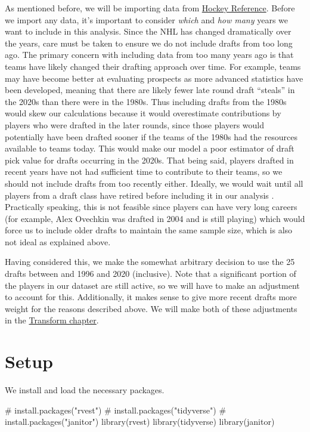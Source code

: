 \documentclass[
  letterpaper,
  DIV=11,
  numbers=noendperiod]{scrreprt}
\newenvironment{Shaded}{\begin{snugshade}}{\end{snugshade}}
\newcommand{\CommentTok}[1]{\textcolor[rgb]{0.37,0.37,0.37}{#1}}
\newcommand{\FunctionTok}[1]{\textcolor[rgb]{0.28,0.35,0.67}{#1}}
\newcommand{\NormalTok}[1]{\textcolor[rgb]{0.00,0.23,0.31}{#1}}
\begin{document}
As mentioned before, we will be importing data from
\href{https://www.hockey-reference.com/draft}{Hockey Reference}. Before
we import any data, it's important to consider \emph{which} and
\emph{how many} years we want to include in this analysis. Since the NHL
has changed dramatically over the years, care must be taken to ensure we
do not include drafts from too long ago. The primary concern with
including data from too many years ago is that teams have likely changed
their drafting approach over time. For example, teams may have become
better at evaluating prospects as more advanced statistics have been
developed, meaning that there are likely fewer late round draft
``steals'' in the 2020s than there were in the 1980s. Thus including
drafts from the 1980s would skew our calculations because it would
overestimate contributions by players who were drafted in the later
rounds, since those players would potentially have been drafted sooner
if the teams of the 1980s had the resources available to teams today.
This would make our model a poor estimator of draft pick value for
drafts occurring in the 2020s. That being said, players drafted in
recent years have not had sufficient time to contribute to their teams,
so we should not include drafts from too recently either. Ideally, we
would wait until all players from a draft class have retired before
including it in our analysis . Practically speaking, this is not
feasible since players can have very long careers (for example, Alex
Ovechkin was drafted in 2004 and is still playing) which would force us
to include older drafts to maintain the same sample size, which is also
not ideal as explained above.

Having considered this, we make the somewhat arbitrary decision to use
the 25 drafts between and 1996 and 2020 (inclusive). Note that a
significant portion of the players in our dataset are still active, so
we will have to make an adjustment to account for this. Additionally, it
makes sense to give more recent drafts more weight for the reasons
described above. We will make both of these adjustments in the
\href{https://trevsteu.github.io/Stat468_Final/transform.html}{Transform
chapter}.

\section{Setup}\label{setup}

We install and load the necessary packages.

\begin{Shaded}
\begin{Highlighting}[]
\CommentTok{\# install.packages("rvest")}
\CommentTok{\# install.packages("tidyverse")}
\CommentTok{\# install.packages("janitor")}
\FunctionTok{library}\NormalTok{(rvest)}
\FunctionTok{library}\NormalTok{(tidyverse)}
\FunctionTok{library}\NormalTok{(janitor)}
\end{Highlighting}
\end{Shaded}
\end{document}
